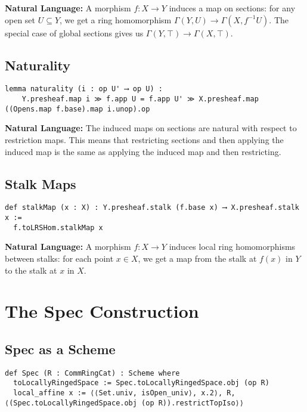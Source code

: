 \documentclass{article}
\theoremstyle{definition}
\begin{document}
\textbf{Natural Language:} A morphism $f: X \to Y$ induces a map on sections: for any open set $U \subseteq Y$, we get a ring homomorphism $\Gamma(Y, U) \to \Gamma(X, f^{-1}U)$. The special case of global sections gives us $\Gamma(Y, \top) \to \Gamma(X, \top)$.

\subsection{Naturality}

\begin{lstlisting}
lemma naturality (i : op U' ⟶ op U) :
    Y.presheaf.map i ≫ f.app U = f.app U' ≫ X.presheaf.map ((Opens.map f.base).map i.unop).op
\end{lstlisting}

\textbf{Natural Language:} The induced maps on sections are natural with respect to restriction maps. This means that restricting sections and then applying the induced map is the same as applying the induced map and then restricting.

\subsection{Stalk Maps}

\begin{lstlisting}
def stalkMap (x : X) : Y.presheaf.stalk (f.base x) ⟶ X.presheaf.stalk x :=
  f.toLRSHom.stalkMap x
\end{lstlisting}

\textbf{Natural Language:} A morphism $f: X \to Y$ induces local ring homomorphisms between stalks: for each point $x \in X$, we get a map from the stalk at $f(x)$ in $Y$ to the stalk at $x$ in $X$.

\section{The Spec Construction}

\subsection{Spec as a Scheme}

\begin{lstlisting}
def Spec (R : CommRingCat) : Scheme where
  toLocallyRingedSpace := Spec.toLocallyRingedSpace.obj (op R)
  local_affine x := ⟨⟨Set.univ, isOpen_univ⟩, x.2⟩, R, ⟨(Spec.toLocallyRingedSpace.obj (op R)).restrictTopIso⟩⟩
\end{lstlisting}
\end{document}
